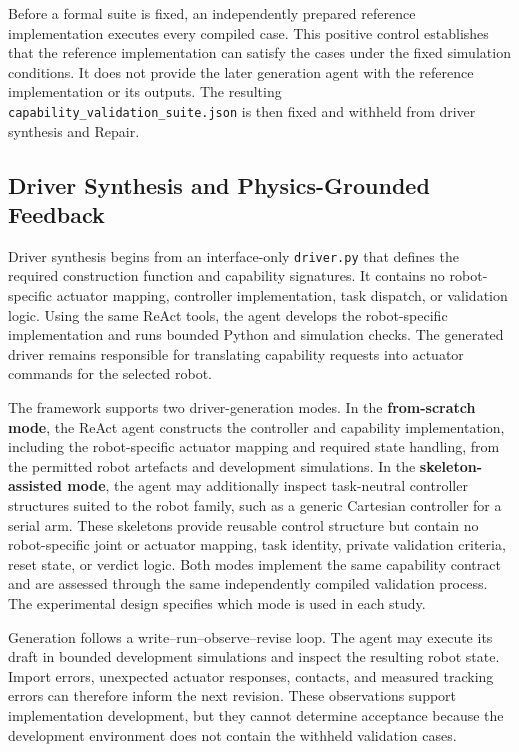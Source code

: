 Before a formal suite is fixed, an independently prepared reference
implementation executes every compiled case. This positive control establishes
that the reference implementation can satisfy the cases under the fixed
simulation conditions. It does not provide the later generation agent with the
reference implementation or its outputs. The resulting
\texttt{capability\_validation\_suite.json} is then fixed and withheld from
driver synthesis and Repair.

\subsection{Driver Synthesis and Physics-Grounded Feedback}

Driver synthesis begins from an interface-only \texttt{driver.py} that defines
the required construction function and capability signatures. It contains no
robot-specific actuator mapping, controller implementation, task dispatch, or
validation logic. Using the same ReAct tools, the agent develops the
robot-specific implementation and runs bounded Python and simulation checks.
The generated driver remains responsible for translating capability requests
into actuator commands for the selected robot.

The framework supports two driver-generation modes. In the
\textbf{from-scratch mode}, the ReAct agent constructs the controller and
capability implementation, including the robot-specific actuator mapping and
required state handling, from the permitted robot artefacts and development
simulations. In the \textbf{skeleton-assisted mode}, the agent may additionally
inspect task-neutral controller structures suited to the robot family, such as
a generic Cartesian controller for a serial arm. These skeletons provide
reusable control structure but contain no robot-specific joint or actuator
mapping, task identity, private validation criteria, reset state, or verdict
logic. Both modes implement the same capability contract and are assessed
through the same independently compiled validation process. The experimental
design specifies which mode is used in each study.

Generation follows a write--run--observe--revise loop. The agent may execute
its draft in bounded development simulations and inspect the resulting robot
state. Import errors, unexpected actuator responses, contacts, and measured
tracking errors can therefore inform the next revision. These observations
support implementation development, but they cannot determine acceptance
because the development environment does not contain the withheld validation
cases.

